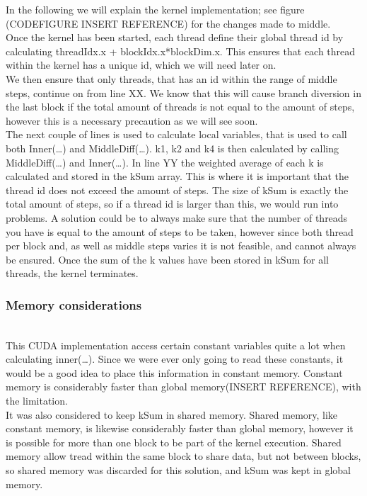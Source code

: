 In the following we will explain the kernel implementation; see figure (CODEFIGURE INSERT REFERENCE) for the changes made to middle. \\

Once the kernel has been started, each thread define their global thread id by calculating threadIdx.x + blockIdx.x*blockDim.x. This ensures that each thread within the kernel has a unique id, which we will need later on.\\

We then ensure that only threads, that has an id within the range of middle steps, continue on from line XX. We know that this will cause branch diversion in the last block if the total amount of threads is not equal to the amount of steps, however this is a necessary precaution as we will see soon.\\

The next couple of lines is used to calculate local variables, that is used to call both Inner(…) and MiddleDiff(…). k1, k2 and k4 is then calculated by calling MiddleDiff(…) and Inner(…). In line YY the weighted average of each k is calculated and stored in the kSum array. This is where it is important that the thread id does not exceed the amount of steps. The size of kSum is exactly the total amount of steps, so if a thread id is larger than this, we would run into problems. A solution could be to always make sure that the number of threads you have is equal to the amount of steps to be taken, however since both thread per block and, as well as middle steps varies it is not feasible, and cannot always be ensured. Once the sum of the k values have been stored in kSum for all threads, the kernel terminates.\\

\subsubsection{Memory considerations} \hfill \\
This CUDA implementation access certain constant variables quite a lot when calculating inner(…). Since we were ever only going to read these constants, it would be a good idea to place this information in constant memory. Constant memory is considerably faster than global memory(INSERT REFERENCE), with the limitation.\\

It was also considered to keep kSum in shared memory. Shared memory, like constant memory, is likewise considerably faster than global memory, however it is possible for more than one block to be part of the kernel execution. Shared memory allow tread within the same block to share data, but not between blocks, so shared memory was discarded for this solution, and kSum was kept in global memory.\\

